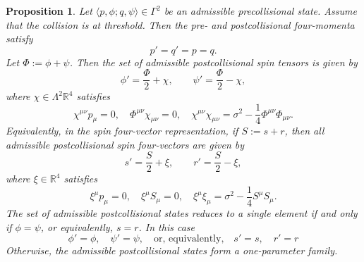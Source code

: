 \documentclass[10pt,a4paper]{amsart}
\newtheorem{proposition}[theorem]{Proposition}
\begin{document}
\begin{proposition}\label{thresholdcase}
Let $\langle p,\phi;q,\psi\rangle\in\Gamma^2$ be an admissible precollisional state. 
Assume that the collision is at threshold.
Then the pre- and postcollisional four-momenta satisfy
\[
p'=q'=p=q.
\] 
Let $\Phi:=\phi+\psi$. 
Then the set of admissible postcollisional spin tensors is given by
\[
\phi'=\frac{\Phi}{2}+\chi,
\qquad
\psi'=\frac{\Phi}{2}-\chi,
\]
where $\chi\in\Lambda^2\mathbb R^4$ satisfies
\[
\chi^{\mu\nu}p_\mu=0,\quad 
\Phi^{\mu\nu}\chi_{\mu\nu}=0,
\quad
\chi^{\mu\nu}\chi_{\mu\nu}=\sigma^2-\frac14\Phi^{\mu\nu}\Phi_{\mu\nu}.
\]
Equivalently, in the spin four-vector representation, if $S:=s+r$,
then all admissible postcollisional spin four-vectors are given by
\[
s'=\frac{S}{2}+\xi,
\qquad
r'=\frac{S}{2}-\xi,
\]
where $\xi\in\mathbb R^4$ satisfies
\[
\xi^\mu p_\mu=0,\quad
\xi^\mu S_\mu=0,\quad 
\xi^\mu\xi_\mu=\sigma^2-\frac14 S^\mu S_\mu.
\]
The set of admissible postcollisional states reduces to a single element if and only if $\phi=\psi$,
or equivalently, $s=r$. In this case
\begin{equation}\label{physical}
\phi'=\phi,\quad \psi'=\psi,\quad\text{or, equivalently,}\quad
s'=s,\quad r'=r
\end{equation}
Otherwise, the admissible postcollisional states form a one-parameter family.
\end{proposition}
\end{document}
